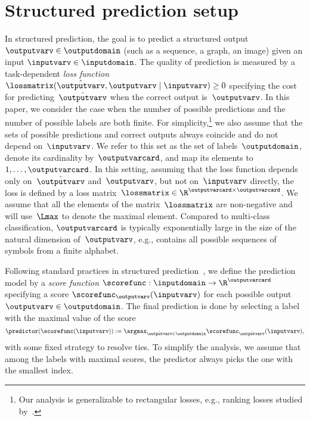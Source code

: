 \documentclass{article}
\begin{document}
%

\vspace{-1.5mm}
\section{Structured prediction setup}
\label{sec:notation}
\vspace{-1mm}
In structured prediction, the goal is to predict
%
a structured output~$\outputvarv \in \outputdomain$
(such as a sequence, a graph, an image) given an input $\inputvarv \in \inputdomain$.
The quality of prediction is measured by a task-dependent \emph{loss function}~$\lossmatrix(\hat{\outputvarv},\outputvarv \mid \inputvarv) \geq 0$ specifying the cost for predicting~$\hat{\outputvarv}$ when the correct output is~$\outputvarv$.
In this paper, we consider the case when the number of possible predictions and the number of possible labels are both finite.
For simplicity,\footnote{Our analysis is generalizable to rectangular losses, e.g., ranking losses studied by~\citet{ramaswamy13rankSurrogates}.
%
} we also assume that the sets of possible predictions and correct outputs always coincide and do not depend on~$\inputvarv$.
We refer to this set as the set of labels~$\outputdomain$, denote its cardinality by~$\outputvarcard$, and map its elements to $1,\dots,\outputvarcard$.
In this setting, assuming that the loss function depends only on~$\hat{\outputvarv}$ and~$\outputvarv$, but not on~$\inputvarv$ directly, the loss is defined by a loss matrix~$\lossmatrix \in\R^{\outputvarcard \times \outputvarcard}$.
We assume that all the elements of the matrix~$\lossmatrix$ are non-negative and will use~$\Lmax$ to denote the maximal element.
Compared to multi-class classification, $\outputvarcard$ is typically exponentially large in the size of the natural dimension of~$\outputvarv$, e.g., contains all possible sequences of symbols from a finite alphabet.

Following standard practices in structured prediction~\citep{collins2002,taskar03},
%
we define the prediction model by a \emph{score function} $\scorefunc: \inputdomain \to \R^{\outputvarcard}$ specifying a score $\scorefunc_\outputvarv(\inputvarv)$ for each possible output~$\outputvarv \in \outputdomain$.
The final prediction is done by selecting a label with the maximal value of the score\vspace{-0.5mm}
\begin{equation}
\label{eq:predictor}
\predictor(\scorefunc(\inputvarv)) := \argmax_{\hat{\outputvarv} \in \outputdomain} \scorefunc_{\hat{\outputvarv}}(\inputvarv),
\end{equation}
with some fixed strategy to resolve ties.
To simplify the analysis, we assume that among the labels with maximal scores, the predictor always picks the one with the smallest index.
\end{document}
